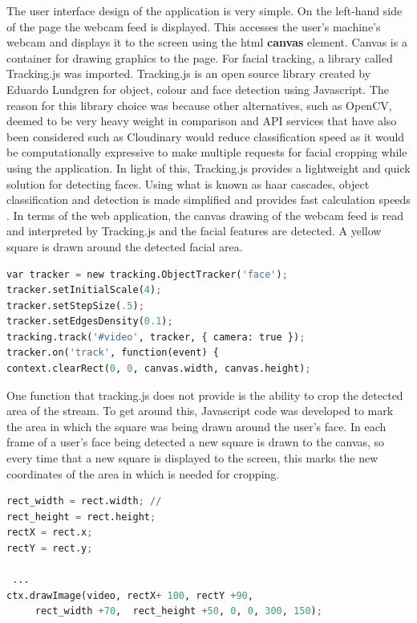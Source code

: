 The user interface design of the application is very simple. On the left-hand side of the page the webcam feed is displayed. This accesses the user's machine's webcam and displays it to the screen using the html \textbf{canvas} element. Canvas is a container for drawing graphics to the page. For facial tracking, a library called Tracking.js was imported. Tracking.js is an open source library created by Eduardo Lundgren for object, colour and face detection using Javascript. The reason for this library choice was because other alternatives, such as OpenCV, deemed to be very heavy weight in comparison and API services that have also been considered such as Cloudinary would reduce classification speed as it would be computationally expressive to make multiple requests for facial cropping while using the application. 
In light of this, Tracking.js provides a lightweight and quick solution for detecting faces. Using what is known as haar cascades, object classification and detection is made simplified and provides fast calculation speeds \citep{viola}. In terms of the web application, the canvas drawing of the webcam feed is read and interpreted by Tracking.js and the facial features are detected. A yellow square is drawn around the detected facial area.

\begin{lstlisting}[language=python, frame=single]
var tracker = new tracking.ObjectTracker('face');
tracker.setInitialScale(4);
tracker.setStepSize(.5);
tracker.setEdgesDensity(0.1);
tracking.track('#video', tracker, { camera: true });
tracker.on('track', function(event) {
context.clearRect(0, 0, canvas.width, canvas.height);
\end{lstlisting}

One function that tracking.js does not provide is the ability to crop the detected area of the stream. To get around this, Javascript code was developed to mark the area in which the square was being drawn around the user's face. In each frame of a user's face being detected a new square is drawn to the canvas, so every time that a new square is displayed to the screen, this marks the new coordinates of the area in which is needed for cropping. 

\begin{lstlisting}[language=python, frame=single]
rect_width = rect.width; // 
rect_height = rect.height;
rectX = rect.x;
rectY = rect.y;

 ...
ctx.drawImage(video, rectX+ 100, rectY +90,
	 rect_width +70,  rect_height +50, 0, 0, 300, 150);
\end{lstlisting}

